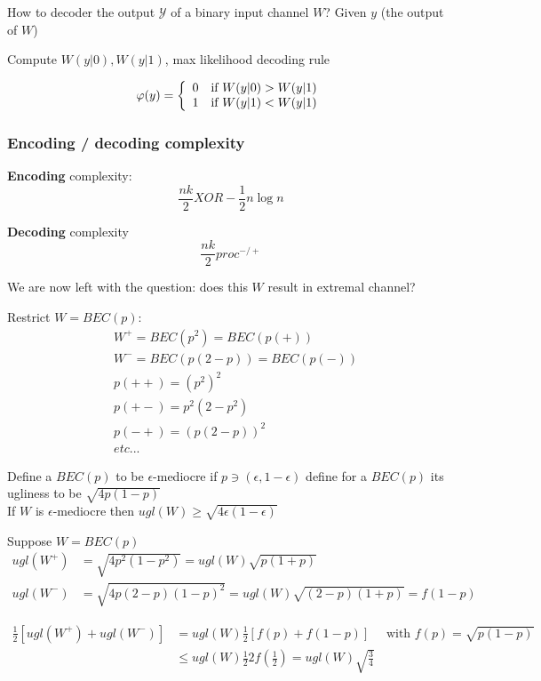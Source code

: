 \documentclass[twoside]{article}
\theoremstyle{definition} %
\def\Y{\mathcal{Y}}
\begin{document}

How to decoder the output $\Y$ of a binary input channel $W$? Given $y$ (the output of $W$)

Compute $W(y|0), W(y|1)$, max likelihood decoding rule

\[
\varphi(y) =
\left\{
\begin{array}{c c}
  0 & \text{if } W(y|0) > W(y|1) \\
  1 & \text{if } W(y|1) < W(y|1) \\
\end{array}
\right.
\]


\subsubsection*{Encoding / decoding complexity}

\textbf{Encoding} complexity:
\[
  \frac{nk}{2} XOR - \frac{1}{2} n \log n
\]

\textbf{Decoding} complexity
\[
  \frac{nk}{2} proc^{-/+}
\]

We are now left with the question: does this $W$ result in extremal channel?

Restrict $W = BEC(p)$:
\begin{align*}
  & W^+ = BEC(p^2) = BEC(p(+)) \\
  & W^- = BEC(p(2-p)) = BEC(p(-)) \\
  & p(++) = (p^2)^2 \\
  & p(+-) = p^2 (2 - p^2) \\
  & p(-+) = (p(2-p))^2 \\
  & etc...
\end{align*}

Define a $BEC(p)$ to be $\epsilon$-mediocre if $p \ni (\epsilon, 1-\epsilon)$ define for a $BEC(p)$ its ugliness to be $\sqrt{4 p(1-p)}$ \\
If $W$ is $\epsilon$-mediocre then $ugl(W) \geq \sqrt{4 \epsilon ( 1 - \epsilon)}$

Suppose $W = BEC(p)$
\begin{align*}
  ugl(W^+) &= \sqrt{4 p^2 (1-p^2)}    = ugl(W) \sqrt{p (1+p)} \\
  ugl(W^-) &= \sqrt{4 p (2-p)(1-p)^2} = ugl(W) \sqrt{(2-p)(1+p)} = f(1-p)
\end{align*}

\begin{align*}
  \frac{1}{2} [ugl(W^+) + ugl(W^-)] &= ugl(W) \frac{1}{2} [f(p) + f(1-p)] \quad \text{ with } f(p) = \sqrt{p(1-p)} \\
    &\leq ugl(W) \frac{1}{2} 2 f(\frac{1}{2}) = ugl(W) \sqrt{\frac{3}{4}}
\end{align*}
\end{document}
